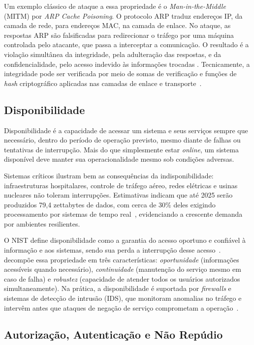 \documentclass[12pt,a4paper]{report}
\begin{document}
Um exemplo clássico de ataque a essa propriedade é o
\textit{Man-in-the-Middle} (MITM) por \textit{ARP Cache Poisoning}. O
protocolo ARP traduz endereços IP, da camada de rede, para endereços MAC,
na camada de enlace. No ataque, as respostas ARP são falsificadas para
redirecionar o tráfego por uma máquina controlada pelo atacante, que
passa a interceptar a comunicação. O resultado é a violação simultânea da
integridade, pela adulteração das respostas, e da confidencialidade,
pelo acesso indevido às informações trocadas \cite{fortinet2024}.
Tecnicamente, a integridade pode ser verificada por meio de somas de
verificação e funções de \textit{hash} criptográfico aplicadas nas
camadas de enlace e transporte~\cite{kurose2021}.

\subsection{Disponibilidade}

Disponibilidade é a capacidade de acessar um sistema e seus serviços
sempre que necessário, dentro do período de operação previsto, mesmo
diante de falhas ou tentativas de interrupção. Mais do que simplesmente
estar \textit{online}, um sistema disponível deve manter sua
operacionalidade mesmo sob condições adversas.

Sistemas críticos ilustram bem as consequências da indisponibilidade:
infraestruturas hospitalares, controle de tráfego aéreo, redes elétricas
e usinas nucleares não toleram interrupções. Estimativas indicam que até
2025 serão produzidos 79,4 zettabytes de dados, com cerca de 30\% deles
exigindo processamento por sistemas de tempo real~\cite{intel2024},
evidenciando a crescente demanda por ambientes resilientes.

O NIST define disponibilidade como a garantia do acesso oportuno e
confiável à informação e aos sistemas, sendo sua perda a interrupção
desse acesso~\cite{nist2004}.  decompõe essa
propriedade em três características: \textit{oportunidade} (informações
acessíveis quando necessário), \textit{continuidade} (manutenção do
serviço mesmo em caso de falha) e \textit{robustez} (capacidade de
atender todos os usuários autorizados simultaneamente).
Na prática, a disponibilidade é suportada por \textit{firewalls} e
sistemas de detecção de intrusão (IDS), que monitoram anomalias no
tráfego e intervêm antes que ataques de negação de serviço comprometam
a operação~\cite{kurose2021}.

\subsection{Autorização, Autenticação e Não Repúdio}
\end{document}

